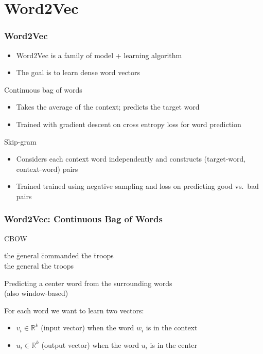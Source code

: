\section{Word2Vec}
\frame{\tableofcontents[currentsection]}

\begin{frame}
\frametitle{Word2Vec}
\begin{itemize}[<+->]
	\item Word2Vec is a family of model + learning algorithm
	\item The goal is to learn dense word vectors
\end{itemize}
\pause
\begin{alertblock}{Continuous bag of words}
	\begin{itemize}[<+->]
		\item Takes the average of the context; predicts the target word
		\item Trained with gradient descent on cross entropy loss for word prediction 
	\end{itemize}
\end{alertblock}
\pause
\begin{alertblock}{Skip-gram}
	\begin{itemize}[<+->]
		\item Considers each context word independently and constructs (target-word, context-word) pairs
		\item Trained trained using negative sampling and loss on predicting good vs.\ bad pairs
	\end{itemize}
\end{alertblock}
\end{frame}

\begin{frame}
\frametitle{Word2Vec: Continuous Bag of Words}
\begin{alertblock}{CBOW}
\begin{tabbing}
the \= general \= commanded \= the \= troops\kill \\
the \> general \> \rlap{\underline{\hphantom{commanded}}} \> the \> troops
\end{tabbing}
Predicting a center word from the surrounding words \\
(also window-based)
\end{alertblock}
\pause 
\begin{block}{For each word we want to learn two vectors:}
\begin{itemize}
	\item $v_i \in \mathbb{R}^k$ (input vector) when the word $w_i$ is in the context
	\item $u_i \in \mathbb{R}^k$ (output vector) when the word $u_i$ is in the center 
\end{itemize}
\end{block}
\end{frame}

